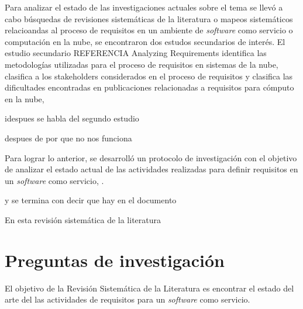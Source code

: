 \documentclass{article}
\begin{document}
Para analizar el estado de las investigaciones actuales sobre el tema se llevó a cabo búsquedas de revisiones sistemáticas de la literatura o 
mapeos sistemáticos relacioandas al proceso de requisitos en un ambiente de \emph{software} como servicio o computación en la nube, se encontraron
dos estudos secundarios de interés. 
El estudio secundario REFERENCIA Analyzing Requirements identifica las metodologías utilizadas para el proceso de requisitos en sistemas de la nube,
clasifica a los stakeholders considerados en el proceso de requisitos y clasifica las dificultades encontradas en publicaciones 
relacionadas a requisitos para cómputo en la nube,  

idespues se habla del segundo estudio 

despues de por que no nos funciona 

Para lograr lo anterior, se desarrolló un protocolo de investigación con el objetivo de analizar el estado actual de
las actividades realizadas para definir requisitos en un \emph{software} como servicio, .

y se termina con decir que hay en el documento 



En esta revisión sistemática de la literatura

\newpage

\section{Preguntas de investigación}
El objetivo de la Revisión Sistemática de la Literatura es encontrar el estado del arte del las actividades de requisitos para un \emph{software} como servicio. 
\end{document}
